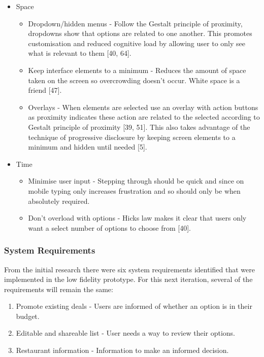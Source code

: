 \documentclass[a4 paper, 12pt]{article}
\begin{document}
\begin{itemize}
            \item Space 
                \begin{itemize}
                    \item Dropdown/hidden menus - Follow the Gestalt principle of proximity, dropdowns show that options are related to one another. This promotes customisation and reduced cognitive load by allowing user to only see what is relevant to them [40, 64].
                    \item Keep interface elements to a minimum - Reduces the amount of space taken on the screen so overcrowding doesn't occur. White space is a friend [47].
                    \item Overlays - When elements are selected use an overlay with action buttons as proximity indicates these action are related to the selected according to Gestalt principle of proximity [39, 51]. This also takes advantage of the technique of progressive disclosure by keeping screen elements to a minimum and hidden until needed [5].
                \end{itemize}
            \item Time
                \begin{itemize}
                    \item Minimise user input - Stepping through should be quick and since on mobile typing only increases frustration and so should only be when absolutely required.
                    \item Don't overload with options - Hicks law makes it clear that users only want a select number of options to choose from [40].
                \end{itemize}
                   
           \end{itemize}    

    \subsubsection{System Requirements}
    From the initial research there were six system requirements identified that were implemented in the low fidelity prototype. For this next iteration, several of the requirements will remain the same:
    \begin{enumerate}
        \item Promote existing deals - Users are informed of whether an option is in their budget.
        \item Editable and shareable list - User needs a way to review their options.
        \item Restaurant information - Information to make an informed decision.
    \end{enumerate}      
\end{document}
